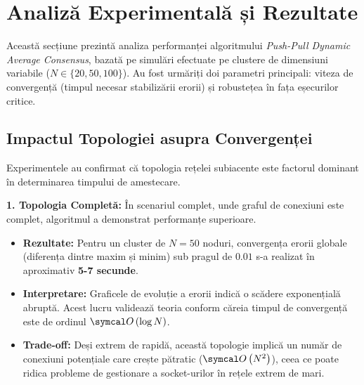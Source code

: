 \section{Analiză Experimentală și Rezultate}
\label{sec:analysis}

Această secțiune prezintă analiza performanței algoritmului \textit{Push-Pull Dynamic Average Consensus}, bazată pe simulări efectuate pe clustere de dimensiuni variabile ($N \in \{20, 50, 100\}$). Au fost urmăriți doi parametri principali: viteza de convergență (timpul necesar stabilizării erorii) și robustețea în fața eșecurilor critice.

\subsection{Impactul Topologiei asupra Convergenței}
Experimentele au confirmat că topologia rețelei subiacente este factorul dominant în determinarea timpului de amestecare.

\textbf{1. Topologia Completă:}
În scenariul complet, unde graful de conexiuni este complet, algoritmul a demonstrat performanțe superioare.
\begin{itemize}
    \item \textbf{Rezultate:} Pentru un cluster de $N=50$ noduri, convergența erorii globale (diferența dintre maxim și minim) sub pragul de $0.01$ s-a realizat în aproximativ \textbf{5-7 secunde}.
    \item \textbf{Interpretare:} Graficele de evoluție a erorii indică o scădere exponențială abruptă. Acest lucru validează teoria conform căreia timpul de convergență este de ordinul $\bigO{\log N}$.
    \item \textbf{Trade-off:} Deși extrem de rapidă, această topologie implică un număr de conexiuni potențiale care crește pătratic ($\bigO{N^2}$), ceea ce poate ridica probleme de gestionare a socket-urilor în rețele extrem de mari.
\end{itemize}

